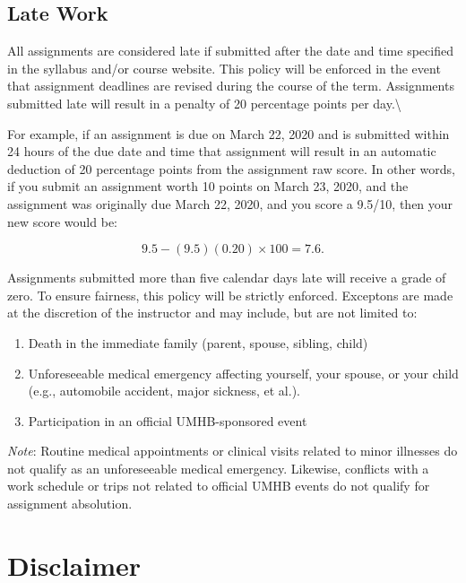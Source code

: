 \documentclass[
]{article}
\providecommand{\tightlist}{%
  \setlength{\itemsep}{0pt}\setlength{\parskip}{0pt}}
\begin{document}
\subsection{Late Work}

All assignments are considered late if submitted after the date and time
specified in the syllabus and/or course website. This policy will be
enforced in the event that assignment deadlines are revised during the
course of the term. Assignments submitted late will result in a penalty
of 20 percentage points per day.\textbackslash{}

For example, if an assignment is due on March 22, 2020 and is submitted
within 24 hours of the due date and time that assignment will result in
an automatic deduction of 20 percentage points from the assignment raw
score. In other words, if you submit an assignment worth 10 points on
March 23, 2020, and the assignment was originally due March 22, 2020,
and you score a 9.5/10, then your new score would be:

\begin{equation}
9.5 - (9.5)(0.20) \times 100 = 7.6.
\end{equation}

Assignments submitted more than five calendar days late will receive a
grade of zero. To ensure fairness, this policy will be strictly
enforced. Exceptons are made at the discretion of the instructor and may
include, but are not limited to:

\begin{enumerate}
\def\labelenumi{\arabic{enumi}.}
\tightlist
\item
  Death in the immediate family (parent, spouse, sibling, child)
\item
  Unforeseeable medical emergency affecting yourself, your spouse, or
  your child (e.g., automobile accident, major sickness, et al.).
\item
  Participation in an official UMHB-sponsored event
\end{enumerate}

\emph{Note}: Routine medical appointments or clinical visits related to
minor illnesses do not qualify as an unforeseeable medical emergency.
Likewise, conflicts with a work schedule or trips not related to
official UMHB events do not qualify for assignment absolution.

\section{Disclaimer}
\end{document}
